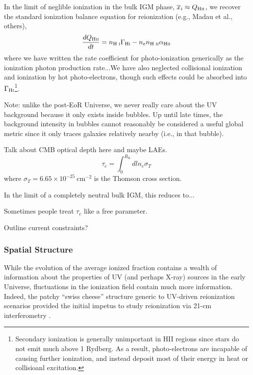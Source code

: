 In the limit of neglible ionization in the bulk IGM phase, $\overline{x}_i \approx Q_{\text{H} {\textsc{ii}}}$, we recover the standard ionization balance equation for reionization (e.g., Madau et al., others),
\begin{equation}
	\frac{d Q_{\text{H} {\textsc{ii}}}}{dt} = n_{\text{H } \textsc{i}} \Gamma_{\text{H} {\textsc{i}}} - n_e n_{\text{H } \textsc{ii}} \alpha_{\text{H} {\textsc{ii}}} \label{eq:ion_balance}
\end{equation}
where we have written the rate coefficient for photo-ionization generically as {\color{red} the ionization photon production rate}...We have also neglected collisional ionization and ionization by hot photo-electrons, though such effects could be absorbed into $\Gamma_{\text{H} {\textsc{i}}}$\footnote{Secondary ionization is generally unimportant in HII regions since stars do not emit much above 1 Rydberg. As a result, photo-electrons are incapable of causing further ionization, and instead deposit most of their energy in heat or collisioanl excitation.}.


Note: unlike the post-EoR Universe, we never really care about the UV background because it only exists inside bubbles. Up until late times, the background intensity in bubbles cannot reasonably be considered a useful global metric since it only traces galaxies relatively nearby (i.e., in that bubble).

Talk about CMB optical depth here and maybe LAEs.
\begin{equation}
	\tau_e = \int_0^{R_{\mathrm{ls}}} dl n_e \sigma_T
\end{equation}
where $\sigma_T = 6.65 \times 10^{-25} \ \mathrm{cm}^{-2}$ is the Thomson cross section.

In the limit of a completely neutral bulk IGM, this reduces to...


Sometimes people treat $\tau_e$ like a free parameter. 

Outline current constraints?


\subsubsection{Spatial Structure} \label{sec:ionization_local}
While the evolution of the average ionized fraction contains a wealth of information about the properties of UV (and perhaps X-ray) sources in the early Universe, fluctuations in the ionization field contain much more information. Indeed, the patchy ``swiss cheese'' structure generic to UV-driven reionization scenarios provided the initial impetus to study reionization via 21-cm interferometry \cite{Madau1997}.

